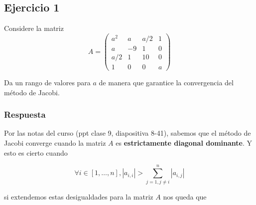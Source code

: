 \documentclass[11pt]{article}
\begin{document}
\newpage
    \hypertarget{ejercicio-1}{%
\subsection{Ejercicio 1}\label{ejercicio-1}}

    Considere la matriz \begin{equation*}
    A = \begin{pmatrix}
            a^2 & a & a/2 & 1 \\
            a & -9 & 1 & 0 \\
            a/2 & 1 & 10 & 0 \\
            1 & 0 & 0 & a
        \end{pmatrix}
\end{equation*}

Da un rango de valores para \(a\) de manera que garantice la
convergencia del método de Jacobi.

    \hypertarget{resp}{%
\subsubsection{Respuesta}\label{resp}}

    Por las notas del curso (ppt clase 9, diapositiva 8-41), sabemos que el
método de Jacobi converge cuando la matriz \(A\) es
\textbf{estrictamente diagonal dominante}. Y esto es cierto cuando

\begin{equation*}
    \forall i \in [1,\dots,n] , |a_{i,i}| > \sum_{j=1, j\neq i}^{n} |a_{i,j}|
\end{equation*}

si extendemos estas desigualdades para la matriz \(A\) nos queda que
\end{document}
